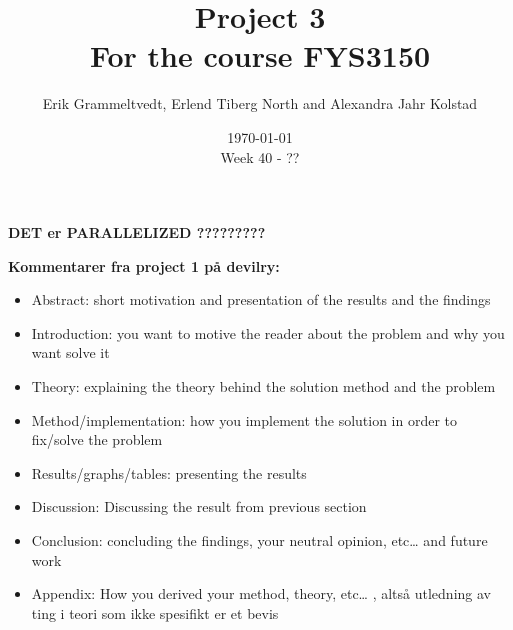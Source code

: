 \documentclass{article}
\begin{document}
\addtocounter{page}{0}

\title{Project 3 \\
      \large For the course FYS3150}
\date{\today \\
    \vspace{1mm}
    \large Week 40 - ??}

\author{Erik Grammeltvedt, Erlend Tiberg North and Alexandra Jahr Kolstad}

\maketitle




\newpage
\clearpage

\textbf{\Large DET er PARALLELIZED ?????????} \\

\vspace{3cm}

\textbf{Kommentarer fra project 1 på devilry:}

\begin{itemize}

\item Abstract: short motivation and presentation of the results and the findings \\

\item Introduction: you want to motive the reader about the problem and why you want solve it \\

\item Theory: explaining the theory behind the solution method and the problem \\

\item Method/implementation: how you implement the solution in order to fix/solve the problem \\

\item Results/graphs/tables: presenting the results \\

\item Discussion: Discussing the result from previous section \\

\item Conclusion: concluding the findings, your neutral opinion, etc… and future work \\

\item Appendix: How you derived your method, theory, etc… , altså utledning av ting i teori som ikke spesifikt er et bevis \\

\end{itemize}
\end{document}
